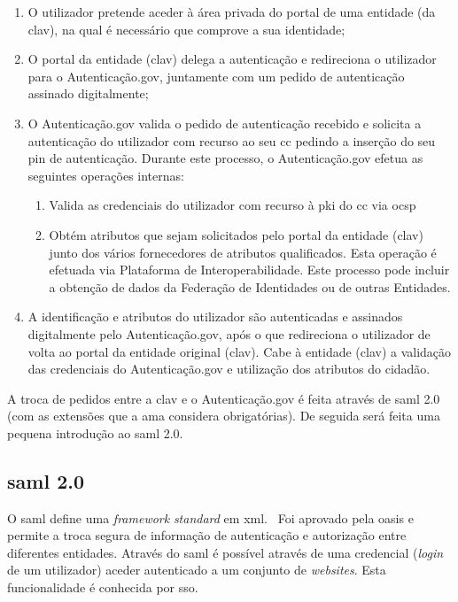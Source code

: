 \begin{enumerate}
    \item O utilizador pretende aceder à área privada do portal de uma entidade (da \acrshort{clav}), na qual é necessário que comprove a sua identidade;
    \item O portal da entidade (\acrshort{clav}) delega a autenticação e redireciona o utilizador para o Autenticação.gov, juntamente com um pedido de autenticação assinado digitalmente;
    \item O Autenticação.gov valida o pedido de autenticação recebido e solicita a autenticação do utilizador com recurso ao seu \acrshort{cc} pedindo a inserção do seu \acrshort{pin} de autenticação. Durante este processo, o Autenticação.gov efetua as seguintes operações internas:
    \begin{enumerate}
        \item Valida as credenciais do utilizador com recurso à \acrshort{pki} do \acrshort{cc} via \acrshort{ocsp}
        \item Obtém atributos que sejam solicitados pelo portal da entidade (\acrshort{clav}) junto dos vários fornecedores de atributos qualificados. Esta operação é efetuada via Plataforma de Interoperabilidade. Este processo pode incluir a obtenção de dados da Federação de Identidades ou de outras Entidades.
    \end{enumerate}
    \item A identificação e atributos do utilizador são autenticadas e assinados digitalmente pelo Autenticação.gov, após o que redireciona o utilizador de volta ao portal da entidade original (\acrshort{clav}). Cabe à entidade (\acrshort{clav}) a validação das credenciais do Autenticação.gov e utilização dos atributos do cidadão.
\end{enumerate}

A troca de pedidos entre a \acrshort{clav} e o Autenticação.gov é feita através de \acrshort{saml} 2.0 (com as extensões que a \acrshort{ama} considera obrigatórias). De seguida será feita uma pequena introdução ao \acrshort{saml} 2.0. 

\subsection{\acrshort{saml} 2.0}
O \acrfull{saml} define uma \textit{framework} \textit{standard} em \acrshort{xml}.~\cite{sam2man} Foi aprovado pela \acrshort{oasis} e permite a troca segura de informação de autenticação e autorização entre diferentes entidades. Através do \acrshort{saml} é possível através de uma credencial (\textit{login} de um utilizador) aceder autenticado a um conjunto de \textit{websites}. Esta funcionalidade é conhecida por \acrfull{sso}.


